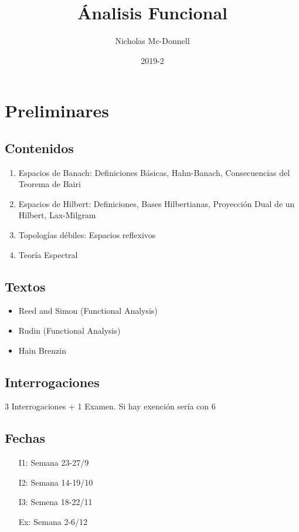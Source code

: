 \documentclass{notetaking}
\title{Ánalisis Funcional}
\author{Nicholas Mc-Donnell}
\date{2019-2}
\begin{document}
\maketitle
\tableofcontents
\newpage

\section*{Preliminares}

\subsection*{Contenidos}
\begin{enumerate}
    \item Espacios de Banach: Definiciones Básicas, Hahn-Banach, Consecuencias del Teorema de Bairi
    \item Espacios de Hilbert: Definiciones, Bases Hilbertianas, Proyección Dual de un Hilbert, Lax-Milgram
    \item Topologías débiles: Espacios reflexivos
    \item Teoría Espectral
\end{enumerate}

\subsection*{Textos}
\begin{itemize}
    \item Reed and Simon (Functional Analysis)
    \item Rudin (Functional Analysis)
    \item Hain Brenzin
\end{itemize}

\subsection*{Interrogaciones}
3 Interrogaciones + 1 Examen. Si hay exención sería con 6

\subsection*{Fechas}
\begin{itemize}
    \item[I1:] Semana 23-27/9
    \item[I2:] Semana 14-19/10
    \item[I3:] Semena 18-22/11
    \item[Ex:] Semana 2-6/12
\end{itemize}
\newpage
\end{document}
